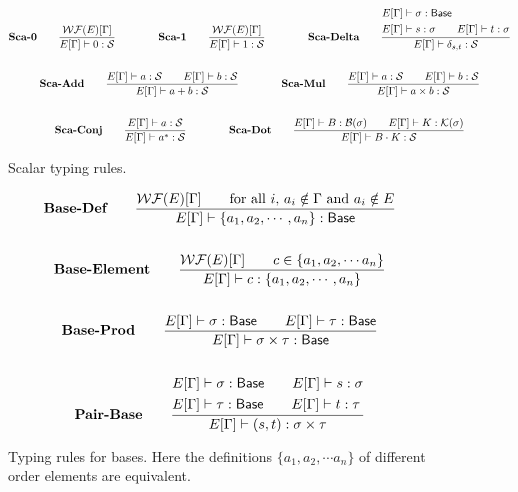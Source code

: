 \documentclass{article}
\begin{document}
\begin{figure}[h]
    \begin{gather*}
        \textbf{Sca-0} \qquad
        \frac{\mathcal{WF}(E)[\Gamma]}{E[\Gamma] \vdash 0 : \mathcal{S}}
        \qquad \qquad
        \textbf{Sca-1} \qquad
        \frac{\mathcal{WF}(E)[\Gamma]}{E[\Gamma] \vdash 1 : \mathcal{S}}
        \qquad \qquad
        \textbf{Sca-Delta} \qquad
        \frac{            
            \begin{aligned}
                & E[\Gamma]\vdash \sigma : \mathsf{Base} \\
                & E[\Gamma]\vdash s : \sigma \qquad E[\Gamma]\vdash t : \sigma
            \end{aligned}} {E[\Gamma] \vdash \delta_{s, t} : \mathcal{S}} \\
        \\
        \textbf{Sca-Add} \qquad
        \frac{E[\Gamma]\vdash a : \mathcal{S} \qquad E[\Gamma]\vdash b : \mathcal{S}}{E[\Gamma]\vdash a + b : \mathcal{S}}
        \qquad \qquad
        \textbf{Sca-Mul} \qquad
        \frac{E[\Gamma]\vdash a : \mathcal{S} \qquad E[\Gamma]\vdash b : \mathcal{S}}{E[\Gamma]\vdash a \times b : \mathcal{S}} \\
        \\
        \textbf{Sca-Conj} \qquad
        \frac{E[\Gamma] \vdash a : \mathcal{S}}{E[\Gamma] \vdash a^*:\mathcal{S}}
        \qquad \qquad
        \textbf{Sca-Dot} \qquad
        \frac{E[\Gamma]\vdash B : \mathcal{B}(\sigma) \qquad E[\Gamma]\vdash K : \mathcal{K}(\sigma)}{E[\Gamma] \vdash B \cdot K : \mathcal{S}}
    \end{gather*}
    \caption{Scalar typing rules.}
\end{figure}

\begin{figure}[h]
    \begin{gather*}
        \textbf{Base-Def} \qquad
        \frac{\mathcal{WF}(E)[\Gamma] \qquad \text{for all $i$, } a_i \notin \Gamma \text{ and } a_i \notin E}
        {E[\Gamma]\vdash \{a_1, a_2, \cdots, a_n\} : \mathsf{Base}} \\
        \\
        \textbf{Base-Element} \qquad
        \frac{\mathcal{WF}(E)[\Gamma] \qquad c \in \{a_1, a_2, \cdots a_n\}}{E[\Gamma]\vdash c : \{a_1, a_2, \cdots, a_n\}} \\
        \\
        \textbf{Base-Prod} \qquad
        \frac{E[\Gamma]\vdash \sigma : \mathsf{Base} \qquad E[\Gamma]\vdash \tau : \mathsf{Base}}{E[\Gamma]\vdash \sigma \times \tau : \mathsf{Base}} \\
        \\
        \textbf{Pair-Base} \qquad
        \frac{
            \begin{aligned}
                & E[\Gamma]\vdash \sigma : \mathsf{Base} \qquad E[\Gamma]\vdash s : \sigma \\
                & E[\Gamma]\vdash \tau : \mathsf{Base} \qquad E[\Gamma]\vdash t : \tau
            \end{aligned}} {E[\Gamma]\vdash (s, t) : \sigma \times \tau} 
        \textbf{}
    \end{gather*}
    \caption{
    Typing rules for bases. 
    Here the definitions $\{a_1, a_2, \cdots a_n\}$ of different order elements are equivalent.}
\end{figure}
\end{document}
